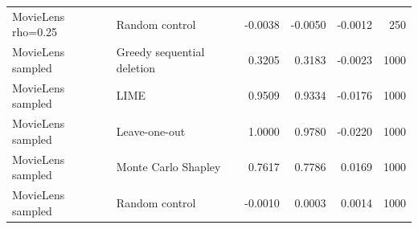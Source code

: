 \begin{longtable}{@{}p{}p{}rrrr@{}}
MovieLens rho=0.25 & Random control & -0.0038 & -0.0050 & -0.0012 & 250 \\
MovieLens sampled & Greedy sequential deletion & 0.3205 & 0.3183 & -0.0023 & 1000 \\
MovieLens sampled & LIME & 0.9509 & 0.9334 & -0.0176 & 1000 \\
MovieLens sampled & Leave-one-out & 1.0000 & 0.9780 & -0.0220 & 1000 \\
MovieLens sampled & Monte Carlo Shapley & 0.7617 & 0.7786 & 0.0169 & 1000 \\
MovieLens sampled & Random control & -0.0010 & 0.0003 & 0.0014 & 1000 \\
\end{longtable}